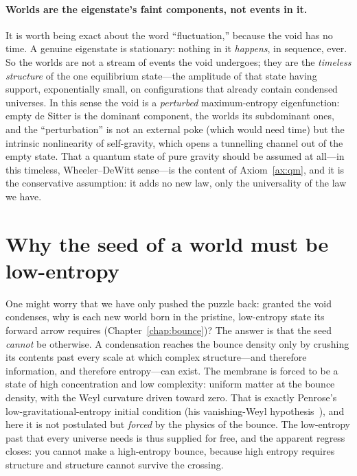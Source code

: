 \paragraph{Worlds are the eigenstate's faint components, not events in it.} It is
worth being exact about the word ``fluctuation,'' because the void has no time. A
genuine eigenstate is stationary: nothing in it \emph{happens}, in sequence, ever.
So the worlds are not a stream of events the void undergoes; they are the
\emph{timeless structure} of the one equilibrium state---the amplitude of that
state having support, exponentially small, on configurations that already contain
condensed universes. In this sense the void is a \emph{perturbed} maximum-entropy
eigenfunction: empty de Sitter is the dominant component, the worlds its
subdominant ones, and the ``perturbation'' is not an external poke (which would
need time) but the intrinsic nonlinearity of self-gravity, which opens a
tunnelling channel out of the empty state. That a quantum state of pure gravity
should be assumed at all---in this timeless, Wheeler--DeWitt sense---is the content
of Axiom~\ref{ax:qm}, and it is the conservative assumption: it adds no new law,
only the universality of the law we have.

\section{Why the seed of a world must be low-entropy}
\label{sec:forced-low-entropy}

One might worry that we have only pushed the puzzle back: granted the void
condenses, why is each new world born in the pristine, low-entropy state its
forward arrow requires (Chapter~\ref{chap:bounce})? The answer is that the seed
\emph{cannot} be otherwise. A condensation reaches the bounce density only by
crushing its contents past every scale at which complex structure---and therefore
information, and therefore entropy---can exist. The membrane is forced to be a
state of high concentration and low complexity: uniform matter at the bounce
density, with the Weyl curvature driven toward zero. That is exactly Penrose's
low-gravitational-entropy initial condition (his vanishing-Weyl
hypothesis~\citep{penrose1979}), and here it is not postulated but \emph{forced}
by the physics of the bounce. The low-entropy past that every universe needs is
thus supplied for free, and the apparent regress closes: you cannot make a
high-entropy bounce, because high entropy requires structure and structure cannot
survive the crossing.

